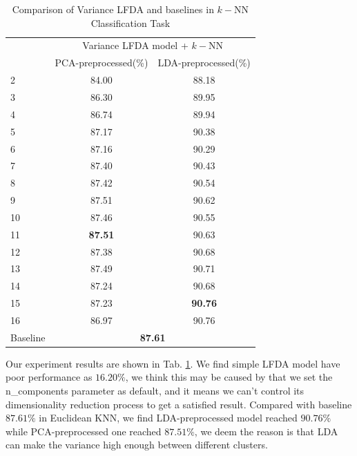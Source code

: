 \documentclass[conference]{IEEEtran}
\begin{document}
\begin{table}[htbp]
	\centering
 	\newcommand{\tabincell}[2]{\begin{tabular}{@{}#1@{}}#2\end{tabular}}
 	\renewcommand\arraystretch{1.0}
 	\caption{Comparison of Variance LFDA and baselines in $k-$NN Classification Task}
 	\label{base3}%
 		\begin{tabular}{@{}p{1cm}<{\centering}|c|c}
 		\hline
 		\multirow{2}{*}{\diagbox[height=2\line,width=1.42cm,font=\tiny]{$k$}{Acc.}{$\mathit{M}$}} &
 		\multicolumn{2}{c}{Variance LFDA model + $k-$NN}\\
 		\cline{2-3}
 		& {PCA-preprocessed(\%)} & {LDA-preprocessed(\%)}\\
 		\hline
 		2   & 84.00 & 88.18\\
 		3   & 86.30 & 89.95\\
 		4   & 86.74 & 89.94\\
 		5   & 87.17 & 90.38\\
 		6   & 87.16 & 90.29\\
 		7   & 87.40 & 90.43\\
 		8   & 87.42 & 90.54\\
 		9   & 87.51 & 90.62\\
 		10   & 87.46 & 90.55\\
 		11   & \textbf{87.51} & 90.63\\
 		12   & 87.38 & 90.68\\
 		13   & 87.49 & 90.71\\
 		14   & 87.24 & 90.68\\
 		15   & 87.23 & \textbf{90.76}\\
		16   & 86.97 & 90.76\\
		\hline
 		Baseline & \multicolumn{2}{c}{\textbf{87.61}} \\
 		\hline
 	\end{tabular}
\end{table}

Our experiment results are shown in Tab. \ref{base3}. We find simple LFDA model have poor performance as $16.20\%$, we think this may be caused by that we set the n\_components parameter as default, and it means we can't control its dimensionality reduction process to get a satisfied result. Compared with baseline $87.61\%$ in Euclidean KNN, we find LDA-preprocessed model reached $90.76\%$ while PCA-preprocessed one reached $87.51\%$, we deem the reason is that LDA can make the variance high enough between different clusters.
\end{document}
